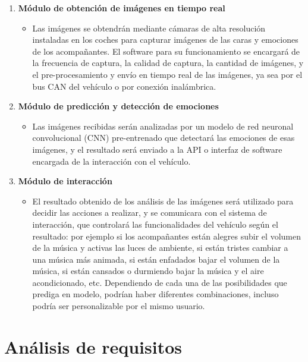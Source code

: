 \documentclass[12pt]{report} %
\begin{document}
\begin{enumerate}

    \item \textbf{Módulo de obtención de imágenes en tiempo real}
    \begin{itemize}
		\item Las imágenes se obtendrán mediante cámaras de alta resolución instaladas en los coches para capturar imágenes de las caras  y emociones de los acompañantes. El software para su funcionamiento se encargará de la frecuencia de captura, la calidad de captura, la cantidad de imágenes, y el pre-procesamiento y envío en tiempo real de las imágenes, ya sea por el bus CAN del vehículo o por conexión inalámbrica.
	\end{itemize}

    \item \textbf{Módulo de predicción y detección de emociones}
    \begin{itemize}
		\item Las imágenes recibidas serán analizadas por un modelo de red neuronal convolucional (CNN) pre-entrenado que detectará las emociones de esas imágenes, y el resultado será enviado a la API o interfaz de software encargada de la interacción con el vehículo. 
	\end{itemize}
    
    \item \textbf{Módulo de interacción}
    \begin{itemize}
		\item El resultado obtenido de los análisis de las imágenes será utilizado para decidir las acciones a realizar, y se comunicara con el sistema de interacción, que controlará las funcionalidades del vehículo según el resultado: por ejemplo si los acompañantes están alegres subir el volumen de la música y activas las luces de ambiente, si están tristes cambiar a una música más animada, si están enfadados bajar el volumen de la música, si están cansados o durmiendo bajar la música y el aire acondicionado, etc. Dependiendo de cada una de las posibilidades que prediga en modelo, podrían haber diferentes combinaciones, incluso podría ser personalizable por el mismo usuario.
	\end{itemize}

\end{enumerate}

\section{Análisis de requisitos}
\end{document}
